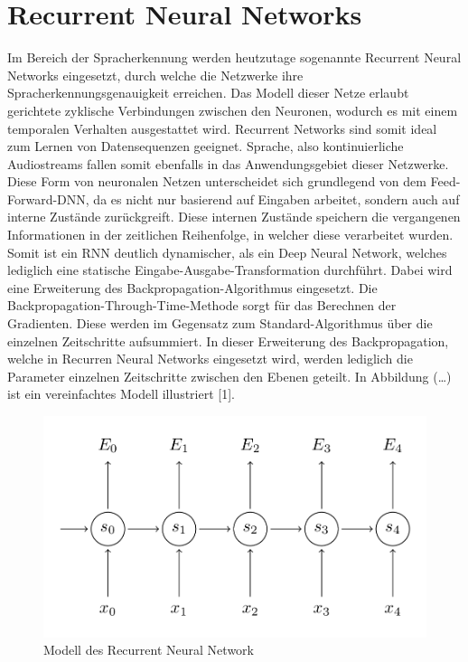 \section{Recurrent Neural Networks}
Im Bereich der Spracherkennung werden heutzutage sogenannte Recurrent Neural Networks eingesetzt, durch welche die Netzwerke ihre Spracherkennungsgenauigkeit erreichen. Das Modell dieser Netze erlaubt gerichtete zyklische Verbindungen zwischen den Neuronen, wodurch es mit einem temporalen Verhalten ausgestattet wird. Recurrent Networks sind somit ideal zum Lernen von Datensequenzen geeignet. Sprache, also kontinuierliche Audiostreams fallen somit ebenfalls in das Anwendungsgebiet dieser Netzwerke. Diese Form von neuronalen Netzen unterscheidet sich grundlegend von dem Feed-Forward-DNN, da es nicht nur basierend auf Eingaben arbeitet, sondern auch auf interne Zustände zurückgreift. Diese internen Zustände speichern die vergangenen Informationen in der zeitlichen Reihenfolge, in welcher diese verarbeitet wurden. Somit ist ein RNN deutlich dynamischer, als ein Deep Neural Network, welches lediglich eine statische Eingabe-Ausgabe-Transformation durchführt. Dabei wird eine Erweiterung des Backpropagation-Algorithmus eingesetzt. Die Backpropagation-Through-Time-Methode sorgt für das Berechnen der Gradienten. Diese werden im Gegensatz zum Standard-Algorithmus über die einzelnen Zeitschritte aufsummiert. In dieser Erweiterung des Backpropagation, welche in Recurren Neural Networks eingesetzt wird, werden lediglich die Parameter einzelnen Zeitschritte zwischen den Ebenen geteilt. In Abbildung (…) ist ein vereinfachtes Modell illustriert [1].

\begin{figure}[h!]
	\centering
	\includegraphics[width=0.5\linewidth]{images/rnn}
	\caption{Modell des Recurrent Neural Network  \cite{GonzalezDominguez.2015}} %
	\label{fig:topology}
\end{figure}

